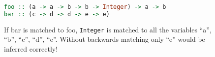 \begin{figure}
    \centering
    \begin{lstlisting}[language=Haskell]
foo :: (a -> a -> b -> b -> Integer) -> a -> b
bar :: (c -> d -> d -> e -> e)\end{lstlisting}
    \caption{If bar is matched to foo, \texttt{Integer} is matched to all the variables ``a'', ``b'', ``c'', ``d'', ``e''. Without backwards matching only ``e'' would be inferred correctly!}
    \label{fig:backwards}
\end{figure}